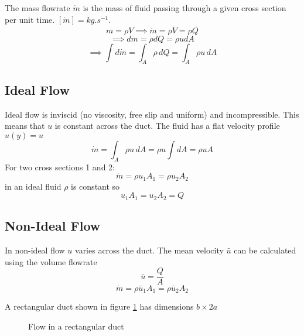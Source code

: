 \documentclass{article}
\begin{document}
    The mass flowrate \(\dot m\) is the mass of fluid passing through a given cross section per unit time.
    \([\dot m]=\si{kg.s^{-1}}\).
    \[m = \rho V\implies \dot m = \rho\dot V = \rho Q\]
    \[\implies d\dot m = \rho dQ = \rho u dA\]
    \[\implies \int d\dot m = \int_A \rho\,dQ = \int_A \rho u\,dA\]
    
    \subsection{Ideal Flow}
    Ideal flow is inviscid (no viscosity, free slip and uniform) and incompressible.
    This means that \(u\) is constant across the duct.
    The fluid has a flat velocity profile \(u(y) = u\)
    \[\dot m = \int_A \rho u\,dA =\rho u\int dA = \rho uA\]
    For two cross sections 1 and 2:
    \[\dot m = \rho u_1A_1 = \rho u_2A_2\]
    in an ideal fluid \(\rho\) is constant so
    \[u_1A_1 = u_2A_2 = Q\]
    
    \subsection{Non-Ideal Flow}
    In non-ideal flow \(u\) varies across the duct.
    The mean velocity \(\bar u\) can be calculated using the volume flowrate
    \[\bar u = \frac{Q}{A}\]
    \[\dot m = \rho \bar u_1A_1 = \rho \bar u_2A_2\]
    
    \example
    A rectangular duct shown in figure \ref{fig:flow in rectangular duct} has dimensions \(b\times 2a\)
    \begin{figure}[ht]
        \centering
        \caption{Flow in a rectangular duct}
        \label{fig:flow in rectangular duct}
    \end{figure}
\end{document}
